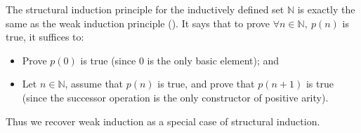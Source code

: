\begin{example}
The structural induction principle for the inductively defined set $\mathbb{N}$ is exactly the same as the weak induction principle (). It says that to prove $\forall n \in \mathbb{N},~ p(n)$ is true, it suffices to:
\begin{itemize}
\item Prove $p(0)$ is true (since $0$ is the only basic element); and
\item Let $n \in \mathbb{N}$, assume that $p(n)$ is true, and prove that $p(n+1)$ is true (since the successor operation is the only constructor of positive arity).
\end{itemize}
Thus we recover weak induction as a special case of structural induction.
\end{example}

